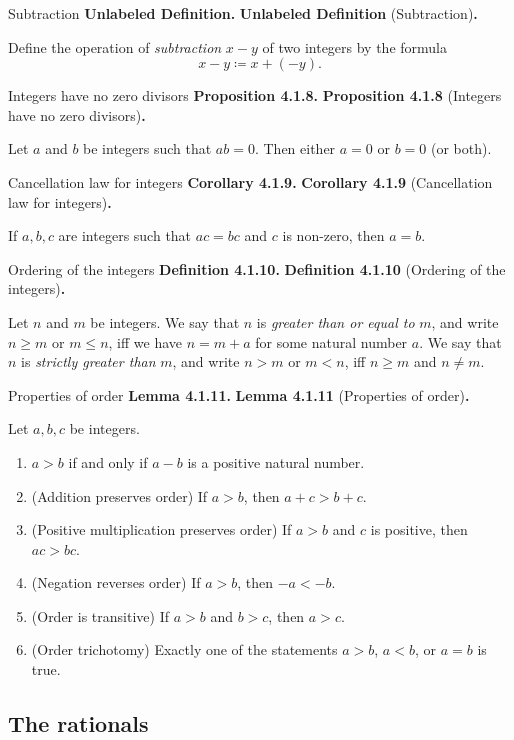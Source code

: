 \documentclass[12pt]{article}
\newenvironment{df}[2][\relax]{
\vspace{4mm}
    \noindent\setlength{\parskip}{1em}%
    \ifx#1\relax%
        \textbf{#2. }%
    \else%
        \textbf{#2} (#1)\textbf{. }%
    \fi%
    \ignorespaces%
}{}
\theoremstyle{remark}
\begin{document}
\begin{df}[Subtraction]{Unlabeled Definition}
    Define the operation of \emph{subtraction} $x - y$ of two integers by the formula
    {\setlength{\belowdisplayskip}{-10pt} \setlength{\belowdisplayshortskip}{-10pt}
    \[
        x - y \coloneqq x + (-y).
    \]
    }
\end{df}

\begin{df}[Integers have no zero divisors]{Proposition 4.1.8}
    Let $a$ and $b$ be integers such that $ab = 0$.
    Then either $a = 0$ or $b = 0$ (or both).
\end{df}


\begin{df}[Cancellation law for integers]{Corollary 4.1.9}
    If $a, b, c$ are integers such that $ac = bc$ and $c$ is non-zero, then $a = b$.
\end{df}


\begin{df}[Ordering of the integers]{Definition 4.1.10}
    Let $n$ and $m$ be integers.
    We say that $n$ is \emph{greater than or equal to} $m$, 
    and write $n \ge m$ or $m \le n$,
    iff we have $n = m + a$ for some natural number $a$.
    We say that $n$ is \emph{strictly greater than} $m$,
    and write $n > m$ or $m < n$,
    iff $n \ge m$ and $n \ne m$.
\end{df}


\begin{df}[Properties of order]{Lemma 4.1.11}
    Let $a, b, c$ be integers.
    \begin{enumerate}[topsep=0mm,label=(\alph*)]
        \item $a > b$ if and only if $a - b$ is a positive natural number.
        \item (Addition preserves order) If $a > b$, then $a + c > b + c$.
        \item (Positive multiplication preserves order) If $a > b$ and $c$ is positive, then $ac > bc$.
        \item (Negation reverses order) If $a > b$, then $-a < -b$.
        \item (Order is transitive) If $a > b$ and $b > c$, then $a > c$.
        \item (Order trichotomy) Exactly one of the statements $a > b$, $a < b$, or $a = b$ is true.
    \end{enumerate}
\end{df}


\subsection{The rationals}
\end{document}
